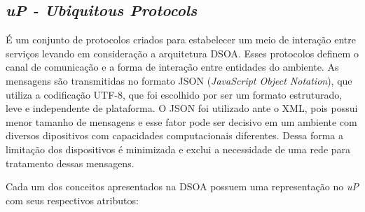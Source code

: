 \subsection{\emph{uP - Ubiquitous Protocols}}

É um conjunto de protocolos criados para estabelecer um meio de interação entre serviços levando em consideração a arquitetura DSOA. Esses protocolos definem o canal de comunicação e a forma de interação entre entidades do ambiente. As mensagens são transmitidas no formato JSON (\emph{JavaScript Object Notation}), que utiliza a codificação UTF-8, que foi escolhido por ser um formato estruturado, leve e independente de plataforma. O JSON foi utilizado ante o XML, pois possui menor tamanho de mensagens e esse fator pode ser decisivo em um ambiente com diversos dipositivos com capacidades computacionais diferentes. Dessa forma a limitação dos dispositivos é minimizada e exclui a necessidade de uma rede para tratamento dessas mensagens.

Cada um dos conceitos apresentados na DSOA possuem uma representação no \emph{uP} com seus respectivos atributos:

